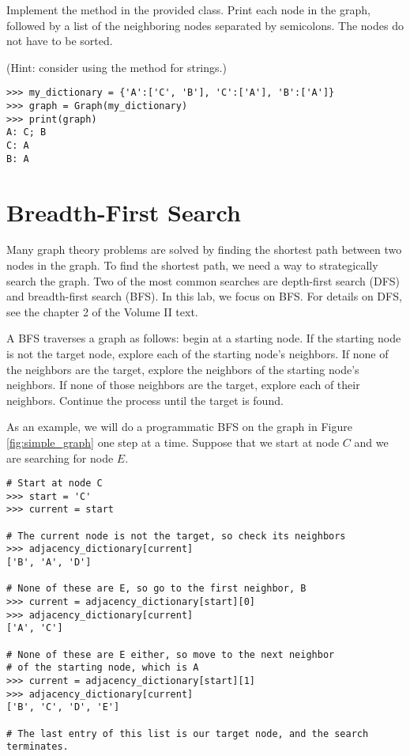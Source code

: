 \begin{problem}
Implement the  method in the provided  class.
Print each node in the graph, followed by a list of the neighboring nodes separated by semicolons.
The nodes do not have to be sorted.

(Hint: consider using the  method for strings.)

\begin{lstlisting}
>>> my_dictionary = {'A':['C', 'B'], 'C':['A'], 'B':['A']}
>>> graph = Graph(my_dictionary)
>>> print(graph)
A: C; B
C: A
B: A
\end{lstlisting}
\end{problem}

\section*{Breadth-First Search}

Many graph theory problems are solved by finding the shortest path between two nodes in the graph.
To find the shortest path, we need a way to strategically search the graph.
Two of the most common searches are depth-first search (DFS) and breadth-first search (BFS).
In this lab, we focus on BFS.
For details on DFS, see the chapter 2 of the Volume II text.

A BFS traverses a graph as follows: begin at a starting node.
If the starting node is not the target node, explore each of the starting node's neighbors.
If none of the neighbors are the target, explore the neighbors of the starting node's neighbors.
If none of those neighbors are the target, explore each of their neighbors.
Continue the process until the target is found.

As an example, we will do a programmatic BFS on the graph in Figure \ref{fig:simple_graph} one step at a time.
Suppose that we start at node $C$ and we are searching for node $E$.

\begin{lstlisting}
# Start at node C
>>> start = 'C'
>>> current = start

# The current node is not the target, so check its neighbors
>>> adjacency_dictionary[current]
['B', 'A', 'D']

# None of these are E, so go to the first neighbor, B
>>> current = adjacency_dictionary[start][0]
>>> adjacency_dictionary[current]
['A', 'C']

# None of these are E either, so move to the next neighbor
# of the starting node, which is A
>>> current = adjacency_dictionary[start][1]
>>> adjacency_dictionary[current]
['B', 'C', 'D', 'E']

# The last entry of this list is our target node, and the search terminates.
\end{lstlisting}

